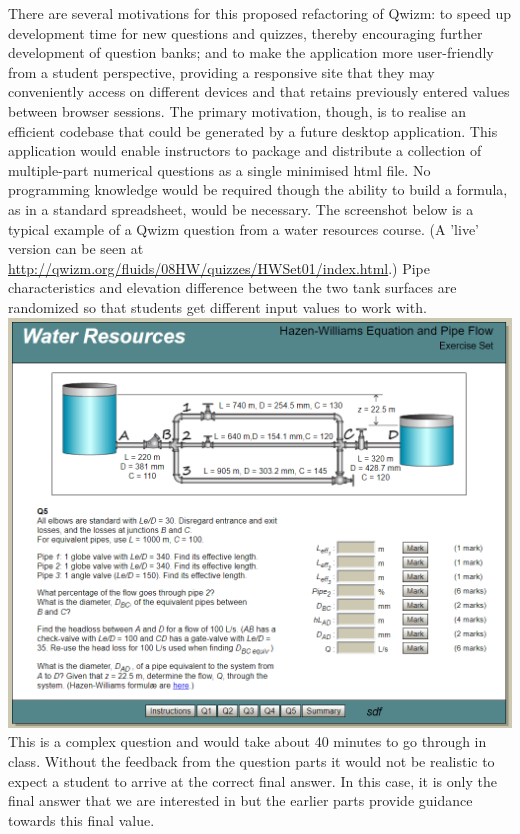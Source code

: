 \documentclass{tufte-handout}
\begin{document}
\parm
There are several motivations for this proposed refactoring of Qwizm: to speed up development time for new questions and quizzes, thereby encouraging further development of question banks; and to make the application more user-friendly from a student perspective, providing a responsive site that they may conveniently access on different devices and that retains previously entered values between browser sessions.
\parm
The primary motivation, though, is to realise an efficient codebase that could be generated by a future desktop application. This application would enable instructors to package and distribute a collection of multiple-part numerical questions as a single minimised html file.  No programming knowledge would be required though the ability to build a formula, as in a standard spreadsheet, would be necessary.
\parm
The screenshot below is a typical example of a Qwizm question from a water resources course. (A 'live' version can be seen at  \href{http://qwizm.org/fluids/08HW/quizzes/HWSet01/index.html}{http://qwizm.org/fluids/08HW/quizzes/HWSet01/index.html}.) Pipe characteristics and elevation difference between the two tank surfaces are randomized so that students get different input values to work with.
\parb
\includegraphics[width=1\linewidth]{includes/hw.png}
\parb
\newpage
This is a complex question and would take about 40 minutes to go through in class. Without the feedback from the question parts it would not be realistic to expect a student to arrive at the correct final answer. In this case, it is only the final answer that we are interested in but the earlier parts provide guidance towards this final value.
\end{document}
